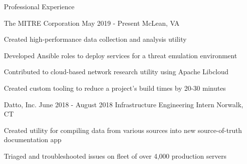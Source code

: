 \documentclass[8pt]{resume} %
\begin{document}

\begin{rSection}{Professional Experience}

    \begin{rSubsection}
        {The MITRE Corporation}
        {May 2019 - Present}
        {McLean, VA}
    \item Created high-performance data collection and analysis utility
    \item Developed Ansible roles to deploy services for a threat emulation
        environment
    \item Contributed to cloud-based network research utility using Apache
        Libcloud
    \item Created custom tooling to reduce a project's build times by 20-30
        minutes
    \end{rSubsection}


    \begin{rSubsection}
        {Datto, Inc.}
        {June 2018 - August 2018}
        {Infrastructure Engineering Intern}
        {Norwalk, CT}
    \item Created utility for compiling data from various sources into new
        source-of-truth documentation app
    \item Triaged and troubleshooted issues on fleet of over 4,000 production
        servers
    \end{rSubsection}
%
%
%
%


\end{rSection}
\end{document}
